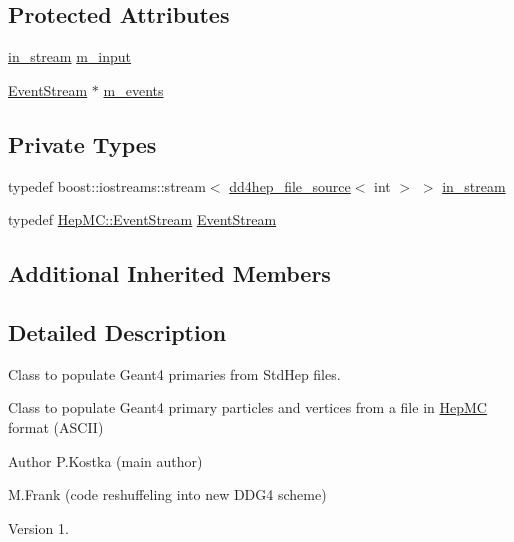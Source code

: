 \subsection*{Protected Attributes}
\begin{DoxyCompactItemize}
\item 
\hyperlink{class_d_d4hep_1_1_simulation_1_1_geant4_event_reader_hep_m_c_a1a456562e141e47288810fb708fa3815}{in\+\_\+stream} \hyperlink{class_d_d4hep_1_1_simulation_1_1_geant4_event_reader_hep_m_c_ab5768f9462667c171c87dbb0ce830e36}{m\+\_\+input}
\item 
\hyperlink{class_d_d4hep_1_1_simulation_1_1_geant4_event_reader_hep_m_c_a260380eb48d2adb971aaade903a47da8}{Event\+Stream} $\ast$ \hyperlink{class_d_d4hep_1_1_simulation_1_1_geant4_event_reader_hep_m_c_a0e1d85baaaec0af5a18bb63ec3cdd20a}{m\+\_\+events}
\end{DoxyCompactItemize}
\subsection*{Private Types}
\begin{DoxyCompactItemize}
\item 
typedef boost\+::iostreams\+::stream$<$ \hyperlink{class_d_d4hep_1_1dd4hep__file__source}{dd4hep\+\_\+file\+\_\+source}$<$ int $>$ $>$ \hyperlink{class_d_d4hep_1_1_simulation_1_1_geant4_event_reader_hep_m_c_a1a456562e141e47288810fb708fa3815}{in\+\_\+stream}
\item 
typedef \hyperlink{class_d_d4hep_1_1_simulation_1_1_hep_m_c_1_1_event_stream}{Hep\+M\+C\+::\+Event\+Stream} \hyperlink{class_d_d4hep_1_1_simulation_1_1_geant4_event_reader_hep_m_c_a260380eb48d2adb971aaade903a47da8}{Event\+Stream}
\end{DoxyCompactItemize}
\subsection*{Additional Inherited Members}


\subsection{Detailed Description}
Class to populate Geant4 primaries from Std\+Hep files. 

Class to populate Geant4 primary particles and vertices from a file in \hyperlink{namespace_d_d4hep_1_1_simulation_1_1_hep_m_c}{Hep\+MC} format (A\+S\+C\+II)

\begin{DoxyAuthor}{Author}
P.\+Kostka (main author) 

M.\+Frank (code reshuffeling into new D\+D\+G4 scheme) 
\end{DoxyAuthor}
\begin{DoxyVersion}{Version}
1. 
\end{DoxyVersion}


